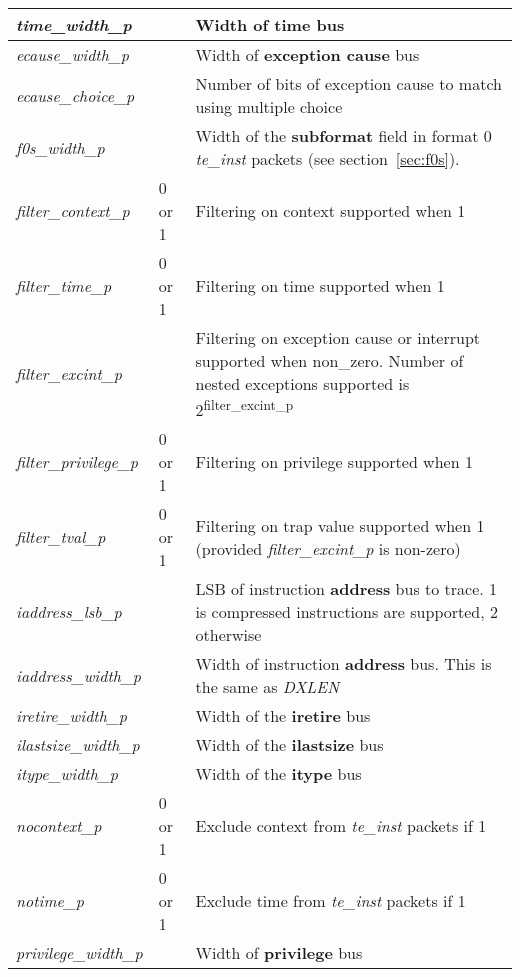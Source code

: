 \begin{table}[h]
\begin{tabulary}{\textwidth}{|l|l|p{100mm}|}
        \hline
        \textit{time\_width\_p} &  & Width of \textbf{time} bus \\
        \hline
        \textit{ecause\_width\_p} &  & Width of \textbf{exception cause} bus \\
        \hline
        \textit{ecause\_choice\_p} & & Number of bits of exception cause to match using multiple choice \\
        \hline
        \textit{f0s\_width\_p} & & Width of the \textbf{subformat} field in format 0 \textit{te\_inst} packets (see section~\ref{sec:f0s}). \\
        \hline
        \textit{filter\_context\_p} & 0 or 1 & Filtering on context supported when 1 \\
        \hline
        \textit{filter\_time\_p} & 0 or 1 & Filtering on time supported when 1 \\
        \hline
        \textit{filter\_excint\_p} & & Filtering on exception cause or interrupt supported when non\_zero.  Number of nested exceptions supported is 2\textsuperscript{filter\_excint\_p} \\
        \hline
        \textit{filter\_privilege\_p} & 0 or 1 & Filtering on privilege supported when 1 \\
        \hline
        \textit{filter\_tval\_p} & 0 or 1 & Filtering on trap value supported when 1 (provided \textit{filter\_excint\_p} is non-zero) \\
        \hline
        \textit{iaddress\_lsb\_p} & & LSB of instruction \textbf{address} bus to trace.  1 is compressed instructions are supported, 2 otherwise\\
        \hline
        \textit{iaddress\_width\_p} & & Width of instruction \textbf{address} bus. This is the same as \textit{DXLEN}\\
        \hline
        \textit{iretire\_width\_p} & & Width of the \textbf{iretire} bus\\
        \hline
        \textit{ilastsize\_width\_p} & & Width of the \textbf{ilastsize} bus\\
        \hline
        \textit{itype\_width\_p} & & Width of the \textbf{itype} bus\\
        \hline
        \textit{nocontext\_p} & 0 or 1 & Exclude context from \textit{te\_inst} packets if 1 \\
        \hline
        \textit{notime\_p} & 0 or 1 & Exclude time from \textit{te\_inst} packets if 1 \\
        \hline
        \textit{privilege\_width\_p} & & Width of \textbf{privilege} bus \\

\end{tabulary}
\end{table}
